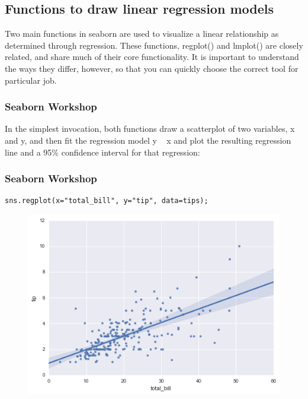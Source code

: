 \documentclass{beamer}
\begin{document}
\subsection{Functions to draw linear regression models}
\begin{frame}
Two main functions in seaborn are used to visualize a linear relationship as determined through regression. These functions, regplot() and lmplot() are closely related, and share much of their core functionality. It is important to understand the ways they differ, however, so that you can quickly choose the correct tool for particular job.
\end{frame}
\begin{frame}[fragile]
	\frametitle{Seaborn Workshop}
	\large
In the simplest invocation, both functions draw a scatterplot of two variables, x and y, and then fit the regression model y ~ x and plot the resulting regression line and a 95\% confidence interval for that regression:
\end{frame}
\begin{frame}[fragile]
	\frametitle{Seaborn Workshop}
	\large
\begin{verbatim}
sns.regplot(x="total_bill", y="tip", data=tips);
\end{verbatim}

\begin{figure}
	\centering
	\includegraphics[width=0.7\linewidth]{images/regression_9_0}
\end{figure}
\end{frame}
\end{document}
